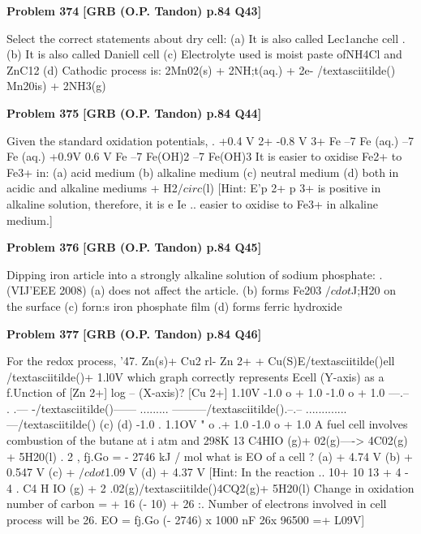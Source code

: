 \begin{problembox}
\textbf{Problem 374} \hfill \textbf{[GRB (O.P. Tandon) p.84 Q43]}
\label{q:ext-grb_all_questions-374}

Select the correct statements about dry cell: 
(a) It is also called Lec1anche cell 
. (b) It is also called Daniell cell 
(c) Electrolyte used is moist paste ofNH4Cl and ZnC12 
(d) Cathodic process is: 
2Mn02(s) + 2NH;t(aq.) + 2e- /textasciitilde() Mn20is) + 2NH3(g)
\end{problembox}

\begin{problembox}
\textbf{Problem 375} \hfill \textbf{[GRB (O.P. Tandon) p.84 Q44]}
\label{q:ext-grb_all_questions-375}

Given the standard oxidation potentials, 
. 
+0.4 V 
2+ 
-0.8 V 
3+ 
Fe --7 Fe 
(aq.) --7 Fe 
(aq.) 
+0.9V 
0.6 V 
Fe --7 Fe(OH)2 --7 Fe(OH)3 
It is easier to oxidise Fe2+ to Fe3+ in: 
(a) acid medium 
(b) alkaline medium 
(c) neutral medium 
(d) both in acidic and alkaline mediums 
+ H2$/circ$(l) 
[Hint: 
E'p 2+ p 3+ is positive in alkaline solution, therefore, it is 
e Ie 
.. 
easier to oxidise 
to Fe3+ in alkaline medium.]
\end{problembox}

\begin{problembox}
\textbf{Problem 376} \hfill \textbf{[GRB (O.P. Tandon) p.84 Q45]}
\label{q:ext-grb_all_questions-376}

Dipping iron article into a strongly alkaline solution of sodium 
phosphate: 
. 
(VIJ'EEE 2008) 
(a) does not affect the article. 
(b) forms Fe203 $/cdot$J;H20 on the surface 
(c) forn:s iron phosphate film 
(d) forms ferric hydroxide
\end{problembox}

\begin{problembox}
\textbf{Problem 377} \hfill \textbf{[GRB (O.P. Tandon) p.84 Q46]}
\label{q:ext-grb_all_questions-377}

For the redox process, 
'47. 
Zn(s)+ Cu2
rl-
Zn 2+ + Cu(S)E/textasciitilde()ell /textasciitilde()+ 1.l0V 
which graph correctly represents Ecell (Y-axis) as a f.Unction of 
[Zn 2+] 
log -- (X-axis)? 
[Cu 2+] 
1.10V 
-1.0 
o 
+ 1.0 
-1.0 
o 
+ 1.0 
---.-- . \underline{\hspace{1cm}} .\underline{\hspace{1cm}}---
-/textasciitilde()------ ......... ---------/textasciitilde().--.-- ............. ---/textasciitilde() 
(c) 
(d) 
-1.0 . 
1.1OV 
" 
o 
.+ 1.0 
-1.0 
o 
+ 1.0 
A fuel cell involves combustion of the butane at i atm and 
298K 
13 
C4HIO (g)+ 
02(g)----> 4C02(g) + 5H20(l) 
. 2 , 
fj.Go = - 2746 kJ / mol 
what is EO of a cell ? 
(a) + 4.74 V 
(b) + 0.547 V (c) + $/cdot$1.09 V 
(d) + 4.37 V 
[Hint: In the reaction 
.. 10+ 10 
13 
+ 4 - 4 
. 
C4 H IO (g) + 2 .02(g)/textasciitilde()4CQ2(g)+ 5H20(l) 
Change in oxidation number of carbon = + 16 (- 10) 
+ 26 
:. Number of electrons involved in cell process will be 26. 
EO = \underline{\hspace{1cm}}fj.Go 
(- 2746) x 1000 
nF 
26x 96500 
=+ L09V]
\end{problembox}

